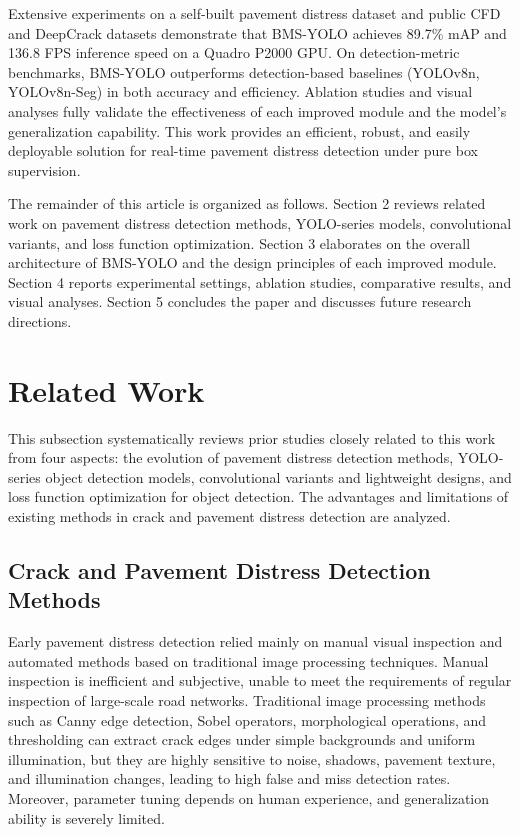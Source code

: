 \documentclass[twocolumn]{sn-jnl}
\begin{document}
	Extensive experiments on a self-built pavement distress dataset and public CFD and DeepCrack datasets demonstrate that BMS-YOLO achieves 89.7\% mAP and 136.8 FPS inference speed on a Quadro P2000 GPU. On detection-metric benchmarks, BMS-YOLO outperforms detection-based baselines (YOLOv8n, YOLOv8n-Seg) in both accuracy and efficiency. Ablation studies and visual analyses fully validate the effectiveness of each improved module and the model's generalization capability. This work provides an efficient, robust, and easily deployable solution for real-time pavement distress detection under pure box supervision.

	The remainder of this article is organized as follows. Section 2 reviews related work on pavement distress detection methods, YOLO-series models, convolutional variants, and loss function optimization. Section 3 elaborates on the overall architecture of BMS-YOLO and the design principles of each improved module. Section 4 reports experimental settings, ablation studies, comparative results, and visual analyses. Section 5 concludes the paper and discusses future research directions.
	
	\section{Related Work}
	This subsection systematically reviews prior studies closely related to this work from four aspects: the evolution of pavement distress detection methods, YOLO-series object detection models, convolutional variants and lightweight designs, and loss function optimization for object detection. The advantages and limitations of existing methods in crack and pavement distress detection are analyzed.
	
	\subsection{Crack and Pavement Distress Detection Methods}
	Early pavement distress detection relied mainly on manual visual inspection and automated methods based on traditional image processing techniques. Manual inspection is inefficient and subjective, unable to meet the requirements of regular inspection of large-scale road networks. Traditional image processing methods such as Canny edge detection, Sobel operators, morphological operations, and thresholding can extract crack edges under simple backgrounds and uniform illumination, but they are highly sensitive to noise, shadows, pavement texture, and illumination changes, leading to high false and miss detection rates. Moreover, parameter tuning depends on human experience, and generalization ability is severely limited.
	
\end{document}
